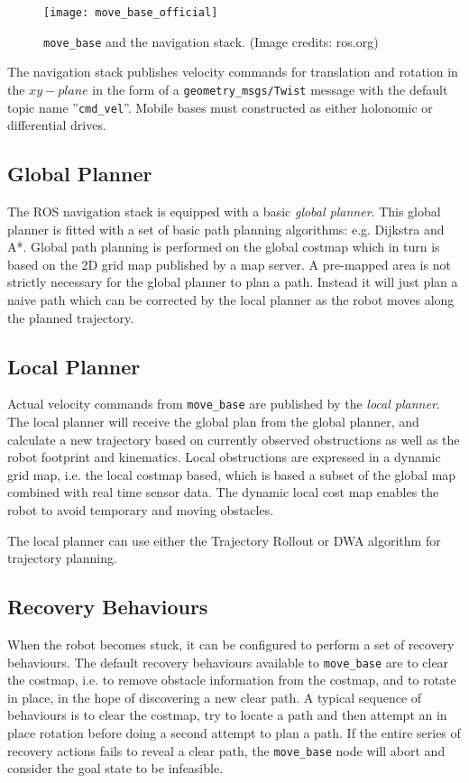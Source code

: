 \begin{figure}[h]
    \centering
    \texttt{[image: move\_base\_official]}
    \caption{\texttt{move\_base} and the navigation stack. (Image credits:  ros.org)}
    \label{fig:move_base_official}
\end{figure}

The navigation stack publishes velocity commands for translation and rotation in the $xy-plane$ in the form of a \texttt{geometry\_msgs/Twist} message with the default topic name ''\texttt{cmd\_vel}''. Mobile bases must constructed as either holonomic or differential drives.

\subsection{Global Planner}

The \ac{ROS} navigation stack is equipped with a basic \textit{global planner}. This global planner is fitted with a set of basic path planning algorithms: e.g. Dijkstra and A*. Global path planning is performed on the global costmap which in turn is based on the 2D grid map published by a map server. A pre-mapped area is not strictly necessary for the global planner to plan a path. Instead it will just plan a naive path which can be corrected by the local planner as the robot moves along the planned trajectory.

\subsection{Local Planner}

Actual velocity commands from \texttt{move\_base} are published by the \textit{local planner}. The local planner will receive the global plan from the global planner, and calculate a new trajectory based on currently observed obstructions as well as the robot footprint and kinematics. Local obstructions are expressed in a dynamic grid map, i.e. the local costmap based, which is based a subset of the global map combined with real time sensor data. The dynamic local cost map enables the robot to avoid temporary and moving obstacles.

The local planner can use either the Trajectory Rollout or \ac{DWA} algorithm for trajectory planning.

\subsection{Recovery Behaviours}

When the robot becomes stuck, it can be configured to perform a set of recovery behaviours. The default recovery behaviours available to \texttt{move\_base} are to clear the costmap, i.e. to remove obstacle information from the costmap, and to rotate in place, in the hope of discovering a new clear path. A typical sequence of behaviours is to clear the costmap, try to locate a path and then attempt an in place rotation before doing a second attempt to plan a path. If the entire series of recovery actions fails to reveal a clear path, the \texttt{move\_base} node will abort and consider the goal state to be infeasible\cite{koubaa2016robot}.